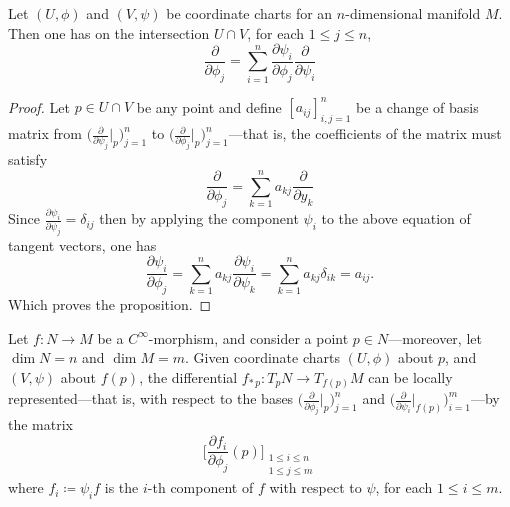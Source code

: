 \begin{proposition}
    \label{prop:transition-matrix}
    Let \((U, \phi)\) and \((V, \psi)\) be coordinate charts for an
    \(n\)-dimensional manifold \(M\). Then one has on the intersection \(U \cap V\),
    for each \(1 \leq j \leq n\),
    \[
        \frac{\partial}{\partial \phi_j}
        = \sum_{i=1}^n \frac{\partial \psi_i}{\partial \phi_j}
        \frac{\partial}{\partial \psi_i}
    \]
\end{proposition}

\begin{proof}
    Let \(p \in U \cap V\) be any point and define \([a_{ij}]_{i, j = 1}^n\)
    be a change of basis matrix from
    \(\big(\frac{\partial}{\partial \psi_j}\big|_p\big)_{j=1}^n\) to
    \(\big(\frac{\partial}{\partial \phi_j}\big|_p\big)_{j=1}^n\)---that is, the
    coefficients of the matrix must satisfy
    \[
        \frac{\partial}{\partial \phi_{j}}
        = \sum_{k=1}^n a_{kj}\frac{\partial}{\partial y_k}
    \]
    Since \(\frac{\partial \psi_i}{\partial \psi_j} = \delta_{ij}\) then by
    applying the component \(\psi_i\) to the above equation of tangent vectors, one
    has
    \[
        \frac{\partial \psi_i}{\partial \phi_j}
        = \sum_{k=1}^n a_{k j} \frac{\partial \psi_i}{\partial \psi_k}
        = \sum_{k=1}^n a_{k j} \delta_{i k}
        = a_{i j}.
    \]
    Which proves the proposition.
\end{proof}

\begin{proposition}
    \label{prop:local-expression-differential}
    Let \(f: N \to M\) be a \(C^{\infty}\)-morphism, and consider a point
    \(p \in N\)---moreover, let \(\dim N = n\) and \(\dim M = m\). Given coordinate
    charts \((U, \phi)\) about \(p\), and \((V, \psi)\) about \(f(p)\), the
    differential \(f_{*\, p}: T_p N \to T_{f(p)} M\) can be locally
    represented---that is, with respect to the bases
    \(\big(\frac{\partial}{\partial \phi_j}\big|_p\big)_{j=1}^n\) and
    \(\big(\frac{\partial}{\partial \psi_i}\big|_{f(p)}\big)_{i=1}^m\)---by the
    matrix
    \[
        \Big[
            \frac{\partial f_i}{\partial \phi_j}(p)
            \Big]_{\substack{1 \leq i \leq n \\ 1 \leq j \leq m}}
    \]
    where \(f_i \coloneq \psi_i f\) is the \(i\)-th component of \(f\) with respect
    to \(\psi\), for each \(1 \leq i \leq m\).
\end{proposition}

